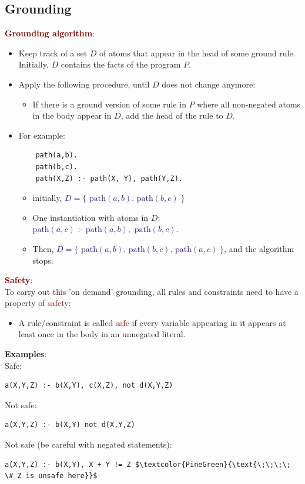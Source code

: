 \subsection{Grounding}
{\Large \textbf{\textcolor{Maroon}{Grounding algorithm}}}:
\begin{itemize}
    \setlength\itemsep{-0.25em}
    \item Keep track of a set $D$ of atoms that appear in the head of some ground rule. Initially, $D$ contains the facts of the program $P$.
    \item Apply the following procedure, until $D$ does not change anymore:
    \begin{itemize}
        \setlength\itemsep{-0.25em}
        \item If there is a ground version of some rule in $P$ where all non-negated atoms in the body appear in $D$, add the head of the rule to $D$.
    \end{itemize}
    \item For example:
    \begin{lstlisting}
    path(a,b).
    path(b,c).
    path(X,Z) :- path(X, Y), path(Y,Z).
    \end{lstlisting}
    \begin{itemize}
        \setlength\itemsep{-0.25em}
        \item initially, \textcolor{MidnightBlue}{$D = \{\text{ path}(a,b). \text{ path}(b,c) \; \}$}
        \item One instantiation with atoms in $D$: \textcolor{MidnightBlue}{$\text{path}(a,c) \text{ :- } \text{path}(a,b), \text{ path}(b,c).$}
        \item Then, \textcolor{MidnightBlue}{$D = \{ \text{ path}(a,b). \text{ path}(b,c). \text{ path}(a,c) \;  \}$}, and the algorithm stops.
    \end{itemize}
\end{itemize}

\newpage
{\Large \textbf{\textcolor{Maroon}{Safety}}}: \\
To carry out this 'on demand' grounding, all rules and constraints need to have a property of \textcolor{Maroon}{safety}:
\begin{itemize}
    \item A rule/constraint is called \textcolor{Maroon}{safe} if every variable appearing in it appears at least once in the body in an unnegated literal.
\end{itemize}

\textbf{Examples}:  \\
Safe:
\begin{lstlisting}
a(X,Y,Z) :- b(X,Y), c(X,Z), not d(X,Y,Z)
\end{lstlisting}

Not safe:
\begin{lstlisting}
a(X,Y,Z) :- b(X,Y) not d(X,Y,Z)
\end{lstlisting}

Not safe (be careful with negated statements):
\begin{lstlisting}
a(X,Y,Z) :- b(X,Y), X + Y != Z $\textcolor{PineGreen}{\text{\;\;\;\; \# Z is unsafe here}}$
\end{lstlisting}